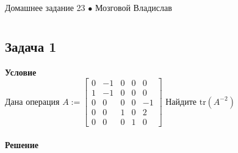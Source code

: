 \newpage
{\large \hspace{3cm} \begin{center} Домашнее задание 23 $\bullet$ Мозговой Владислав \end{center} }
\vspace{-1.5ex}
\hrulefill
	
\fontsize{12pt}{4.5mm}\selectfont
\vspace{-3ex}
\hrulefill
\newline

\section*{}
	\subsection*{\textbf{Задача 1}}
	\textbf{Условие}\\
	Дана операция
	$
	A:=
	\begin{bmatrix}
		0 & -1 & 0 & 0 & 0 \\
		1 & -1 & 0 & 0 & 0 \\
		0 & 0 & 0 & 0 & -1 \\
		0 & 0 & 1 & 0 & 2 \\
		0 & 0 & 0 & 1 & 0
	\end{bmatrix}
	$
	Найдите $\text{tr}(A^{-2})$\\
	\\
	\textbf{Решение}
